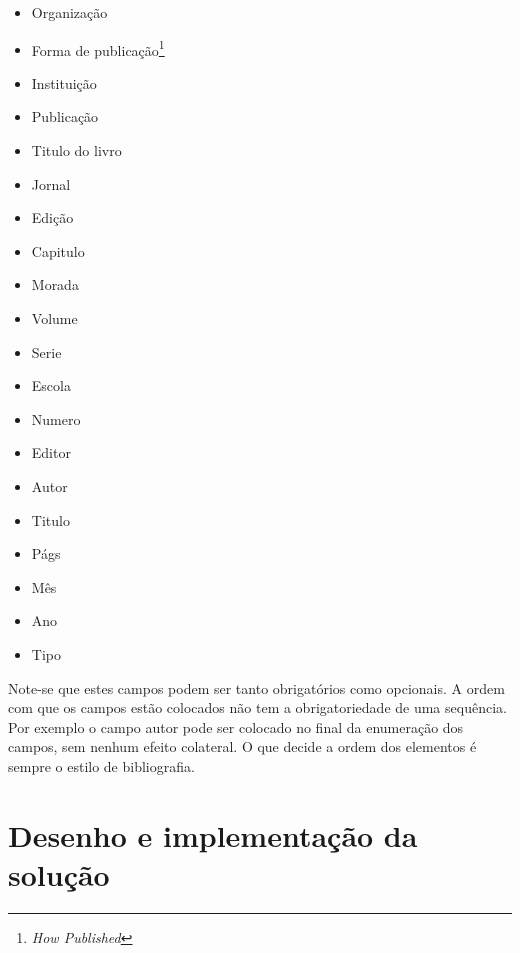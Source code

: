 \begin{itemize}


\item Organização
\item Forma de publicação\footnote{\emph{How Published}}
\item Instituição
\item Publicação
\item Titulo do livro
\item Jornal
\item Edição
\item Capitulo
\item Morada
\item Volume
\item Serie
\item Escola
\item Numero
\item Editor
\item Autor
\item Titulo
\item Págs
\item Mês
\item Ano
\item Tipo

\end{itemize}

Note-se que estes campos podem ser tanto obrigatórios como opcionais.
A ordem com que os campos estão colocados não tem a obrigatoriedade de uma
sequência. Por exemplo o campo autor pode ser colocado no final da enumeração
dos campos, sem nenhum efeito colateral. O que decide a ordem dos elementos
é sempre o estilo de bibliografia. 


\section{Desenho e implementação da solução}
\label{sec:des:b2}

